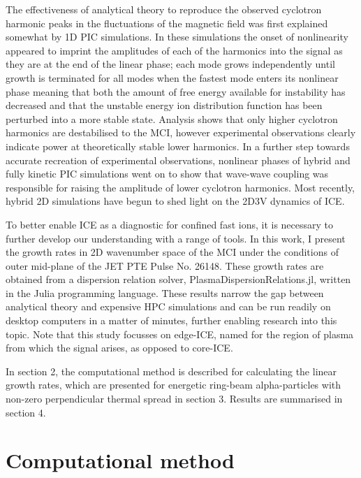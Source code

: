 \documentclass[12pt]{iopart}
\begin{document}
The effectiveness of analytical theory to reproduce the observed cyclotron
harmonic peaks in the fluctuations of the magnetic field was first explained
somewhat by 1D PIC simulations. In these simulations the onset of nonlinearity
appeared to imprint the amplitudes of each of the harmonics into the signal as
they are at the end of the linear phase; each mode grows independently until 
growth is terminated for all modes when the fastest mode enters its nonlinear
phase meaning that both the amount of free energy available for instability has
decreased and that the unstable energy ion distribution function has been
perturbed into a more stable state. Analysis shows that only higher cyclotron
harmonics are destabilised\cite{McClements2015} to the MCI, however experimental
observations clearly indicate power at theoretically stable lower
harmonics\cite{Cottrell1988}. In a further step towards accurate recreation of
experimental observations, nonlinear phases of hybrid\cite{Carbajal2014} and
fully kinetic\cite{Cook2013,Chapman2017} PIC simulations went on to show that
wave-wave coupling was responsible for raising the amplitude of lower cyclotron
harmonics. Most recently, hybrid 2D simulations have begun to shed light on the
2D3V dynamics of ICE\cite{Carbajal2021}.

To better enable ICE as a diagnostic for confined fast ions, it is necessary to
further develop our understanding with a range of tools. In this work, I present
the growth rates in 2D wavenumber space of the MCI under the conditions of
outer mid-plane of the JET PTE\cite{Cottrell1993} Pulse No. 26148. These growth
rates are obtained from a dispersion relation solver,
PlasmaDispersionRelations.jl, written in the Julia programming
language\cite{Bezanson2017}. These results narrow the gap between analytical
theory and expensive HPC simulations and can be run readily on desktop computers
in a matter of minutes, further enabling research into this topic. Note that
this study focusses on edge-ICE, named for the region of plasma from which the signal
arises, as opposed to core-ICE\cite{Ochoukov2018}.

In section 2, the computational method is described for calculating the linear growth rates, which are presented for energetic ring-beam alpha-particles with non-zero perpendicular thermal spread in section 3. Results are summarised in section 4.

\section{Computational method}
\end{document}
